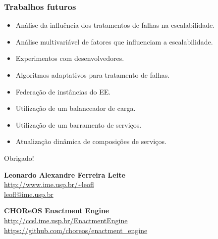 \documentclass{beamer}
\begin{document}
\begin{frame}
\frametitle{Trabalhos futuros}

\begin{itemize}
\item Análise da influência dos tratamentos de falhas na escalabilidade.
\item Análise multivariável de fatores que influenciam a escalabilidade.
\item Experimentos com desenvolvedores.
\item Algoritmos adaptativos para tratamento de falhas.
\item Federação de instâncias do EE.
\item Utilização de um balanceador de carga.
\item Utilização de um barramento de serviços.
\item Atualização dinâmica de composições de serviços.
\end{itemize}

\end{frame}


\begin{frame}

{\Huge \centerline{Obrigado! }}

\vspace{1cm}

\textbf{Leonardo Alexandre Ferreira Leite} \\
\url{http://www.ime.usp.br/~leofl} \\
\url{leofl@ime.usp.br} \\

\vspace{0.6cm}

\textbf{CHOReOS Enactment Engine} \\
\url{http://ccsl.ime.usp.br/EnactmentEngine} \\
\url{https://github.com/choreos/enactment_engine}
\end{frame}

\end{document}
